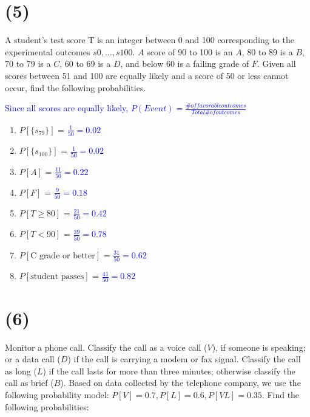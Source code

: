 \documentclass[12pt]{article}
\begin{document}
\section*{(5)}
A student’s test score T is an integer between 0 and 100 corresponding to the
experimental outcomes $s0, \dots , s100$. $A$ score of 90 to 100 is an $A$, 80 to 89 is a $B$, 70
to 79 is a $C$, 60 to 69 is a $D$, and below 60 is a failing grade of $F$. Given all scores
between 51 and 100 are equally likely and a score of 50 or less cannot occur, find the
following probabilities.

\textcolor{blue}{Since all scores are equally likely, $P(Event) = \frac{\# of favorable outcomes}{Total \# of outcomes}$} 

\begin{enumerate}
    \item[a] \(P[\{s_{79}\}]\) = \textcolor{blue}{$\frac{1}{50} = 0.02$}
    \item[b] \(P[\{s_{100}\}]\) = \textcolor{blue}{$\frac{1}{50} = 0.02$}
    \item[c] \(P[A]\) = \textcolor{blue}{$\frac{11}{50} = 0.22$}
    \item[d] \(P[F]\) = \textcolor{blue}{$\frac{9}{50} = 0.18$}
    \item[e] \(P[T \ge 80]\) = \textcolor{blue}{$\frac{21}{50} = 0.42$}
    \item[f] \(P[T < 90]\) = \textcolor{blue}{$\frac{39}{50} = 0.78$}
    \item[g] \(P[\text{C grade or better}]\) = \textcolor{blue}{$\frac{31}{50} = 0.62$}
    \item[h] \(P[\text{student passes}]\) = \textcolor{blue}{$\frac{41}{50} = 0.82$}
\end{enumerate}

\section*{(6)}
Monitor a phone call. Classify the call as a voice call ($V$), if someone is
speaking; or a data call ($D$) if the call is carrying a modem or fax signal. Classify
the call as long ($L$) if the call lasts for more than three minutes; otherwise classify
the call as brief ($B$). Based on data collected by the telephone company, we use the
following probability model: $P[V ] = 0.7, P[L] = 0.6, P[V L] = 0.35.$ Find the following
probabilities:
\end{document}
